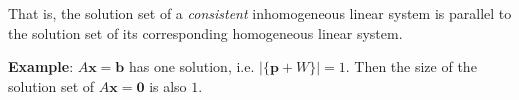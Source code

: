 \begin{paracol}{2}
That is, the solution set of a \textit{consistent} inhomogeneous linear system is parallel to the solution set of its corresponding homogeneous linear system.

\textbf{Example}: $A \mathbf{x} = \mathbf{b}$ has one solution, i.e. $|\{\mathbf{p} + W\}| = 1$. Then the size of the solution set of $A \mathbf{x} = \mathbf{0}$ is also $1$.

\end{paracol}
